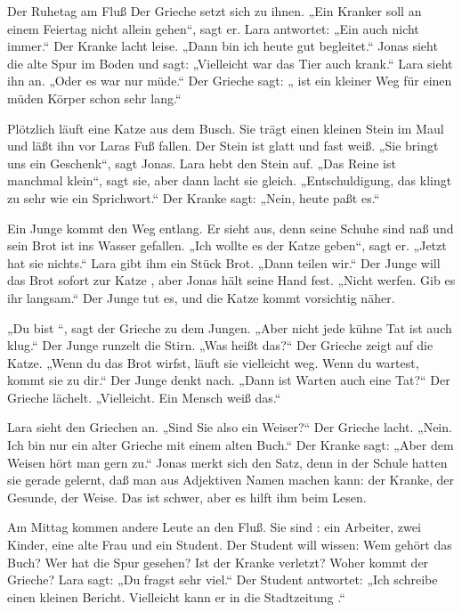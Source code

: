\documentclass[12pt]{nextbook}
\begin{document}
\begin{readersection}{Der Ruhetag am Fluß}
Der Grieche setzt sich zu ihnen. „Ein Kranker soll an einem Feiertag nicht allein gehen“, sagt er. Lara antwortet: „Ein  auch nicht immer.“ Der Kranke lacht leise. „Dann bin ich heute gut begleitet.“ Jonas sieht die alte Spur im Boden und sagt: „Vielleicht war das Tier auch krank.“ Lara sieht ihn an. „Oder es war nur müde.“ Der Grieche sagt: „ ist ein kleiner Weg für einen müden Körper schon sehr lang.“

Plötzlich läuft eine Katze aus dem Busch. Sie trägt einen kleinen Stein im Maul und läßt ihn vor Laras Fuß fallen. Der Stein ist glatt und fast weiß. „Sie bringt uns ein Geschenk“, sagt Jonas. Lara hebt den Stein auf. „Das Reine ist manchmal klein“, sagt sie, aber dann lacht sie gleich. „Entschuldigung, das klingt zu sehr wie ein Sprichwort.“ Der Kranke sagt: „Nein, heute paßt es.“

Ein Junge kommt den Weg entlang. Er sieht  aus, denn seine Schuhe sind naß und sein Brot ist ins Wasser gefallen. „Ich wollte es der Katze geben“, sagt er. „Jetzt hat sie nichts.“ Lara gibt ihm ein Stück Brot. „Dann teilen wir.“ Der Junge will das Brot sofort zur Katze , aber Jonas hält seine Hand fest. „Nicht werfen. Gib es ihr langsam.“ Der Junge tut es, und die Katze kommt vorsichtig näher.

„Du bist “, sagt der Grieche zu dem Jungen. „Aber nicht jede kühne Tat ist auch klug.“ Der Junge runzelt die Stirn. „Was heißt das?“ Der Grieche zeigt auf die Katze. „Wenn du das Brot wirfst, läuft sie vielleicht weg. Wenn du wartest, kommt sie zu dir.“ Der Junge denkt nach. „Dann ist Warten auch eine Tat?“ Der Grieche lächelt. „Vielleicht. Ein  Mensch weiß das.“

Lara sieht den Griechen an. „Sind Sie also ein Weiser?“ Der Grieche lacht. „Nein. Ich bin nur ein alter Grieche mit einem alten Buch.“ Der Kranke sagt: „Aber dem Weisen hört man gern zu.“ Jonas merkt sich den Satz, denn in der Schule hatten sie gerade gelernt, daß man aus Adjektiven Namen machen kann: der Kranke, der Gesunde, der Weise. Das ist schwer, aber es hilft ihm beim Lesen.

Am Mittag kommen andere Leute an den Fluß. Sie sind : ein Arbeiter, zwei Kinder, eine alte Frau und ein Student. Der Student will  wissen: Wem gehört das Buch? Wer hat die Spur gesehen? Ist der Kranke verletzt? Woher kommt der Grieche? Lara sagt: „Du fragst sehr viel.“ Der Student antwortet: „Ich schreibe einen kleinen Bericht. Vielleicht kann er in die Stadtzeitung .“


\end{readersection}
\end{document}
